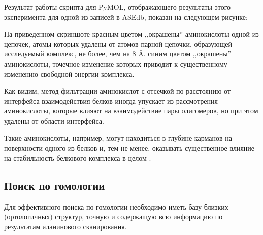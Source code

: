 Результат работы скрипта для PyMOL, отображающего результаты этого эксперимента для одной из записей в ASEdb, показан на следующем рисунке: 


На приведенном скриншоте красным цветом ,,окрашены'' аминокислоты одной из цепочек, атомы которых удалены от атомов парной цепочки, образующей исследуемый комплекс, не более, чем на 8 \AA{}. синим цветом ,,окрашены'' аминокислоты, точечное изменение которых приводит к существенному изменению свободной энергии комплекса. 

Как видим, метод фильтрации аминокислот с отсечкой по расстоянию от интерфейса взаимодействия белков иногда упускает из рассмотрения аминокислоты, которые влияют на взаимодействие пары олигомеров, но при этом удалены от области интерфейса.

Такие аминокислоты, например, могут находиться в глубине карманов на поверхности одного из белков и, тем не менее, оказывать существенное влияние на стабильность белкового комплекса в целом \cite{pockets2004}.

\subsection{Поиск по гомологии}


Для эффективного поиска по гомологии необходимо иметь базу близких (ортологичных) структур, точную и содержащую всю информацию по результатам аланинового сканирования.

